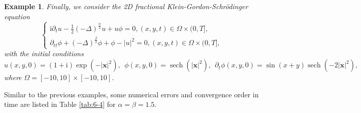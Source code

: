 \documentclass[preprint,compress,3p,10pt,fleqn]{elsarticle}
\numberwithin{equation}{section}
\newtheorem{expl}{Example}[section]
\newenvironment{example}{\begin{expl}\rm}{\end{expl}}
\begin{document}
\begin{example}\label{ex:4}
\cite{fuStructurepreservingAlgorithmsTwodimensional2020}
Finally, we consider the 2D fractional Klein-Gordon-Schr{\"o}dinger equation
\begin{equation}
\begin{cases}
\mathrm{i} \partial_t u-\frac{1}{2}(-\Delta)^{\frac{\alpha}{2}} u+u \phi=0,(x, y, t) \in \Omega \times(0, T],\\
\partial_{t t} \phi+(-\Delta)^{\frac{\beta}{2}} \phi+\phi-|u|^2=0, (x, y, t) \in \Omega \times(0, T],
\end{cases}
\end{equation}
with the initial conditions
\begin{equation}
u(x, y, 0)=(1+\mathrm{i}) \exp \left(-|\boldsymbol{x}|^2\right),~~\phi(x, y, 0)=\operatorname{sech}\left(|\boldsymbol{x}|^2\right),~~ \partial_t \phi(x, y, 0)=\sin (x+y) \operatorname{sech}\left(-2|\boldsymbol{x}|^2\right),
\end{equation}
where $\Omega=[-10,10] \times[-10,10]$.
\end{example}

Similar to the previous examples, some numerical errors and convergence order in time are listed in Table \ref{tab:6-4}
for $\alpha=\beta=1.5$.
\end{document}
